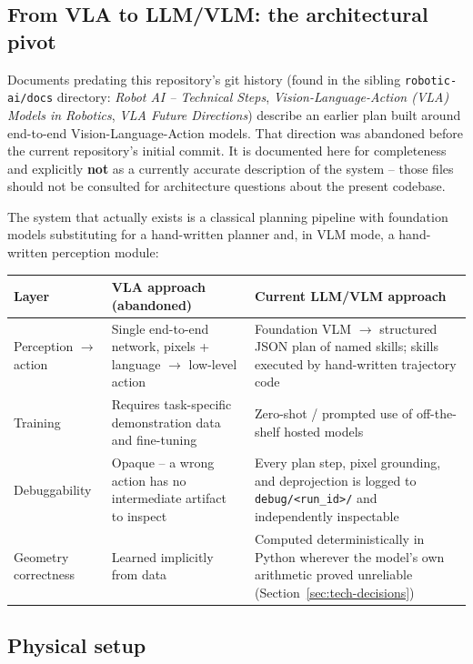 \subsection{From VLA to LLM/VLM: the architectural pivot}

Documents predating this repository's git history (found in the sibling
\texttt{robotic-ai/docs} directory: \emph{Robot AI -- Technical Steps},
\emph{Vision-Language-Action (VLA) Models in Robotics}, \emph{VLA Future
Directions}) describe an earlier plan built around end-to-end
Vision-Language-Action models. That direction was abandoned before the
current repository's initial commit. It is documented here for completeness
and explicitly \textbf{not} as a currently accurate description of the
system -- those files should not be consulted for architecture questions
about the present codebase.

The system that actually exists is a classical planning pipeline with
foundation models substituting for a hand-written planner and, in VLM mode, a
hand-written perception module:

\begin{center}
\begin{tabular}{@{}p{3.2cm}p{5.6cm}p{5.6cm}@{}}
\toprule
\textbf{Layer} & \textbf{VLA approach (abandoned)} & \textbf{Current LLM/VLM approach} \\
\midrule
Perception $\to$ action & Single end-to-end network, pixels + language $\to$
  low-level action & Foundation VLM $\to$ structured JSON plan of named
  skills; skills executed by hand-written trajectory code \\
Training & Requires task-specific demonstration data and fine-tuning &
  Zero-shot / prompted use of off-the-shelf hosted models \\
Debuggability & Opaque -- a wrong action has no intermediate artifact to
  inspect & Every plan step, pixel grounding, and deprojection is logged to
  \texttt{debug/<run\_id>/} and independently inspectable \\
Geometry correctness & Learned implicitly from data & Computed
  deterministically in Python wherever the model's own arithmetic proved
  unreliable (Section~\ref{sec:tech-decisions}) \\
\bottomrule
\end{tabular}
\end{center}

\subsection{Physical setup}

